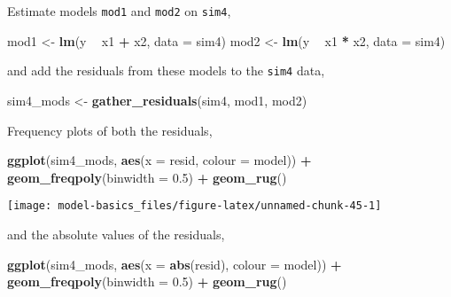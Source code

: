 \documentclass[]{book}
\newenvironment{Shaded}{\begin{snugshade}}{\end{snugshade}}
\newcommand{\DataTypeTok}[1]{\textcolor[rgb]{0.13,0.29,0.53}{#1}}
\newcommand{\FloatTok}[1]{\textcolor[rgb]{0.00,0.00,0.81}{#1}}
\newcommand{\KeywordTok}[1]{\textcolor[rgb]{0.13,0.29,0.53}{\textbf{#1}}}
\newcommand{\NormalTok}[1]{#1}
\newcommand{\OperatorTok}[1]{\textcolor[rgb]{0.81,0.36,0.00}{\textbf{#1}}}
\newcommand{\StringTok}[1]{\textcolor[rgb]{0.31,0.60,0.02}{#1}}
\theoremstyle{plain}
\theoremstyle{remark}
\begin{document}
Estimate models \texttt{mod1} and \texttt{mod2} on \texttt{sim4},

\begin{Shaded}
\begin{Highlighting}[]
\NormalTok{mod1 <-}\StringTok{ }\KeywordTok{lm}\NormalTok{(y }\OperatorTok{~}\StringTok{ }\NormalTok{x1 }\OperatorTok{+}\StringTok{ }\NormalTok{x2, }\DataTypeTok{data =}\NormalTok{ sim4)}
\NormalTok{mod2 <-}\StringTok{ }\KeywordTok{lm}\NormalTok{(y }\OperatorTok{~}\StringTok{ }\NormalTok{x1 }\OperatorTok{*}\StringTok{ }\NormalTok{x2, }\DataTypeTok{data =}\NormalTok{ sim4)}
\end{Highlighting}
\end{Shaded}

and add the residuals from these models to the \texttt{sim4} data,

\begin{Shaded}
\begin{Highlighting}[]
\NormalTok{sim4_mods <-}\StringTok{ }\KeywordTok{gather_residuals}\NormalTok{(sim4, mod1, mod2)}
\end{Highlighting}
\end{Shaded}

Frequency plots of both the residuals,

\begin{Shaded}
\begin{Highlighting}[]

\KeywordTok{ggplot}\NormalTok{(sim4_mods, }\KeywordTok{aes}\NormalTok{(}\DataTypeTok{x =}\NormalTok{ resid, }\DataTypeTok{colour =}\NormalTok{ model)) }\OperatorTok{+}
\StringTok{  }\KeywordTok{geom_freqpoly}\NormalTok{(}\DataTypeTok{binwidth =} \FloatTok{0.5}\NormalTok{) }\OperatorTok{+}
\StringTok{  }\KeywordTok{geom_rug}\NormalTok{()}
\end{Highlighting}
\end{Shaded}

\begin{center}\texttt{[image: model-basics\_files/figure-latex/unnamed-chunk-45-1]} \end{center}

and the absolute values of the residuals,

\begin{Shaded}
\begin{Highlighting}[]
\KeywordTok{ggplot}\NormalTok{(sim4_mods, }\KeywordTok{aes}\NormalTok{(}\DataTypeTok{x =} \KeywordTok{abs}\NormalTok{(resid), }\DataTypeTok{colour =}\NormalTok{ model)) }\OperatorTok{+}
\StringTok{  }\KeywordTok{geom_freqpoly}\NormalTok{(}\DataTypeTok{binwidth =} \FloatTok{0.5}\NormalTok{) }\OperatorTok{+}
\StringTok{  }\KeywordTok{geom_rug}\NormalTok{()}
\end{Highlighting}
\end{Shaded}
\end{document}
